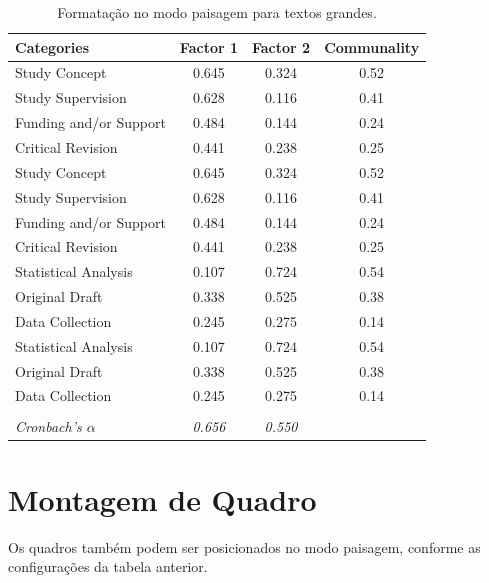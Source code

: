 \begin{landscape}
	\begin{table}[!ht]
		\small
		\centering
		\caption{Formatação no modo paisagem para textos grandes.}
		\label{tab:loadings}
		\begin{tabular*}{\columnwidth}{@{\extracolsep{\fill}}lccc@{}}
			\toprule[1pt]{}\textbf{Categories}      & \textbf{Factor 1} & \textbf{Factor 2} & \textbf{Communality}
			\\\hline
			Study Concept           & 0.645		& 0.324   & 0.52	\\
			Study Supervision		& 0.628		& 0.116   & 0.41	\\
			Funding and/or Support  & 0.484		& 0.144   & 0.24	\\
			Critical Revision   	& 0.441		& 0.238   & 0.25	\\
			Study Concept           & 0.645		& 0.324   & 0.52	\\
			Study Supervision		& 0.628		& 0.116   & 0.41	\\
			Funding and/or Support  & 0.484		& 0.144   & 0.24	\\
			Critical Revision   	& 0.441		& 0.238   & 0.25	\\
			Statistical Analysis 	& 0.107		& 0.724  & 0.54		\\
			Original Draft			& 0.338		& 0.525  & 0.38		\\
			Data Collection			& 0.245   	& 0.275  & 0.14		\\
			Statistical Analysis 	& 0.107		& 0.724  & 0.54		\\
			Original Draft			& 0.338		& 0.525  & 0.38		\\
			Data Collection			& 0.245   	& 0.275  & 0.14		\\
			\hline \\[-1.8ex]
			\textit{Cronbach's $\alpha$}	& \textit{0.656}     & \textit{0.550}  \\
			\bottomrule[1pt]
		\end{tabular*}
	\end{table}
\end{landscape}

\section{Montagem de Quadro}
\label{sec:quadro}
Os quadros também podem ser posicionados no modo paisagem, conforme as configurações da tabela anterior.

